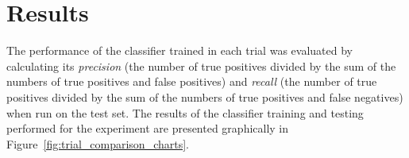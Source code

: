 \documentclass{sig-alternate-05-2015}
\newcommand{\newterm}[1]{{\textit{#1}}}
\begin{document}
	\section{Results} {
	\label{sec:results}

		The performance of the classifier trained in each trial was evaluated by calculating its \newterm{precision} (the number of true positives divided by the sum of the numbers of true positives and false positives) and \newterm{recall} (the number of true positives divided by the sum of the numbers of true positives and false negatives) when run on the test set.
		The results of the classifier training and testing performed for the experiment are presented graphically in Figure~\ref{fig:trial_comparison_charts}.




}
\end{document}
